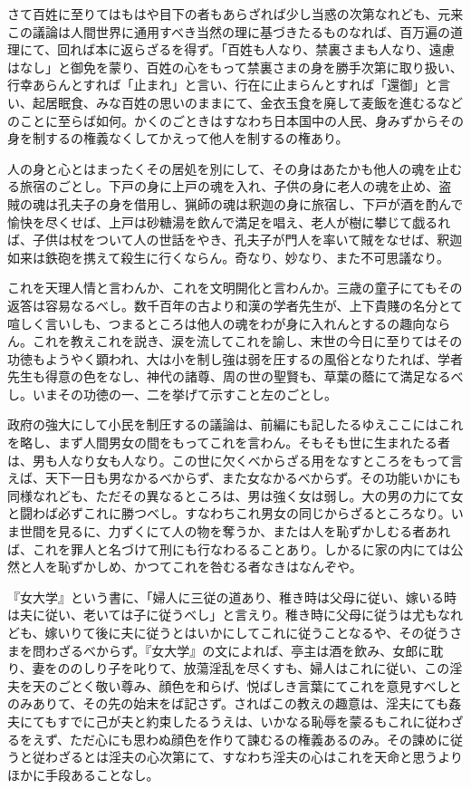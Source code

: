 \documentclass[a4paper, platex, dvipdfmx]{jsarticle}
\begin{document}
さて百姓に至りてはもはや目下の者もあらざれば少し当惑の次第なれども、元来この議論は人間世界に通用すべき当然の理に基づきたるものなれば、百万遍の道理にて、回れば本に返らざるを得ず。「百姓も人なり、禁裏さまも人なり、遠慮はなし」と御免を蒙り、百姓の心をもって禁裏さまの身を勝手次第に取り扱い、行幸あらんとすれば「止まれ」と言い、行在に止まらんとすれば「還御」と言い、起居眠食、みな百姓の思いのままにて、金衣玉食を廃して麦飯を進むるなどのことに至らば如何。かくのごときはすなわち日本国中の人民、身みずからその身を制するの権義なくしてかえって他人を制するの権あり。

人の身と心とはまったくその居処を別にして、その身はあたかも他人の魂を止むる旅宿のごとし。下戸の身に上戸の魂を入れ、子供の身に老人の魂を止め、盗賊の魂は孔夫子の身を借用し、猟師の魂は釈迦の身に旅宿し、下戸が酒を酌んで愉快を尽くせば、上戸は砂糖湯を飲んで満足を唱え、老人が樹に攀じて戯るれば、子供は杖をついて人の世話をやき、孔夫子が門人を率いて賊をなせば、釈迦如来は鉄砲を携えて殺生に行くならん。奇なり、妙なり、また不可思議なり。

これを天理人情と言わんか、これを文明開化と言わんか。三歳の童子にてもその返答は容易なるべし。数千百年の古より和漢の学者先生が、上下貴賤の名分とて喧しく言いしも、つまるところは他人の魂をわが身に入れんとするの趣向ならん。これを教えこれを説き、涙を流してこれを諭し、末世の今日に至りてはその功徳もようやく顕われ、大は小を制し強は弱を圧するの風俗となりたれば、学者先生も得意の色をなし、神代の諸尊、周の世の聖賢も、草葉の蔭にて満足なるべし。いまその功徳の一、二を挙げて示すこと左のごとし。

政府の強大にして小民を制圧するの議論は、前編にも記したるゆえここにはこれを略し、まず人間男女の間をもってこれを言わん。そもそも世に生まれたる者は、男も人なり女も人なり。この世に欠くべからざる用をなすところをもって言えば、天下一日も男なかるべからず、また女なかるべからず。その功能いかにも同様なれども、ただその異なるところは、男は強く女は弱し。大の男の力にて女と闘わば必ずこれに勝つべし。すなわちこれ男女の同じからざるところなり。いま世間を見るに、力ずくにて人の物を奪うか、または人を恥ずかしむる者あれば、これを罪人と名づけて刑にも行なわるることあり。しかるに家の内にては公然と人を恥ずかしめ、かつてこれを咎むる者なきはなんぞや。

『女大学』という書に、「婦人に三従の道あり、稚き時は父母に従い、嫁いる時は夫に従い、老いては子に従うべし」と言えり。稚き時に父母に従うは尤もなれども、嫁いりて後に夫に従うとはいかにしてこれに従うことなるや、その従うさまを問わざるべからず。『女大学』の文によれば、亭主は酒を飲み、女郎に耽り、妻をののしり子を叱りて、放蕩淫乱を尽くすも、婦人はこれに従い、この淫夫を天のごとく敬い尊み、顔色を和らげ、悦ばしき言葉にてこれを意見すべしとのみありて、その先の始末をば記さず。さればこの教えの趣意は、淫夫にても姦夫にてもすでに己が夫と約束したるうえは、いかなる恥辱を蒙るもこれに従わざるをえず、ただ心にも思わぬ顔色を作りて諫むるの権義あるのみ。その諫めに従うと従わざるとは淫夫の心次第にて、すなわち淫夫の心はこれを天命と思うよりほかに手段あることなし。
\end{document}
